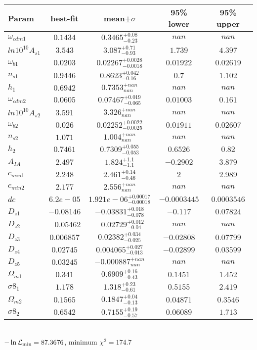 \begin{tabular}{|l|c|c|c|c|} 
 \hline 
Param & best-fit & mean$\pm\sigma$ & 95\% lower & 95\% upper \\ \hline 
$\omega_{cdm 1 }$ &$0.1434$ & $0.3465_{-0.23}^{+0.08}$ & $nan$ & $nan$ \\ 
$ln10^{10}A_{s 1 }$ &$3.543$ & $3.087_{-0.93}^{+0.71}$ & $1.739$ & $4.397$ \\ 
$\omega_{b 1 }$ &$0.0203$ & $0.02267_{-0.0018}^{+0.0028}$ & $0.01922$ & $0.02619$ \\ 
$n_{s 1 }$ &$0.9446$ & $0.8623_{-0.16}^{+0.042}$ & $0.7$ & $1.102$ \\ 
$h_{1 }$ &$0.6942$ & $0.7353_{nan}^{+nan}$ & $nan$ & $nan$ \\ 
$\omega_{cdm 2 }$ &$0.0605$ & $0.07467_{-0.065}^{+0.019}$ & $0.01003$ & $0.161$ \\ 
$ln10^{10}A_{s 2 }$ &$3.591$ & $3.326_{nan}^{+nan}$ & $nan$ & $nan$ \\ 
$\omega_{b 2 }$ &$0.026$ & $0.02252_{-0.0025}^{+0.0022}$ & $0.01911$ & $0.02607$ \\ 
$n_{s 2 }$ &$1.071$ & $1.004_{nan}^{+nan}$ & $nan$ & $nan$ \\ 
$h_{2 }$ &$0.7461$ & $0.7309_{-0.053}^{+0.055}$ & $0.6526$ & $0.82$ \\ 
$A_{IA }$ &$2.497$ & $1.824_{-1.1}^{+1.1}$ & $-0.2902$ & $3.879$ \\ 
$c_{min 1 }$ &$2.248$ & $2.461_{-0.46}^{+0.14}$ & $2$ & $2.989$ \\ 
$c_{min 2 }$ &$2.177$ & $2.556_{nan}^{+nan}$ & $nan$ & $nan$ \\ 
$dc$ &$6.2e-05$ & $1.921e-06_{-0.00018}^{+0.00017}$ & $-0.0003445$ & $0.0003546$ \\ 
$D_{z1 }$ &$-0.08146$ & $-0.03831_{-0.078}^{+0.018}$ & $-0.117$ & $0.07824$ \\ 
$D_{z2 }$ &$-0.05462$ & $-0.02729_{-0.04}^{+0.012}$ & $nan$ & $nan$ \\ 
$D_{z3 }$ &$0.006857$ & $0.02382_{-0.025}^{+0.034}$ & $-0.02808$ & $0.07799$ \\ 
$D_{z4 }$ &$0.02745$ & $0.004065_{-0.013}^{+0.027}$ & $-0.02899$ & $0.03599$ \\ 
$D_{z5 }$ &$0.03245$ & $-0.000887_{nan}^{+nan}$ & $nan$ & $nan$ \\ 
$\Omega_{m 1 }$ &$0.341$ & $0.6909_{-0.43}^{+0.16}$ & $0.1451$ & $1.452$ \\ 
$\sigma8_{1 }$ &$1.178$ & $1.318_{-0.61}^{+0.23}$ & $0.5155$ & $2.419$ \\ 
$\Omega_{m 2 }$ &$0.1565$ & $0.1847_{-0.13}^{+0.04}$ & $0.04871$ & $0.3546$ \\ 
$\sigma8_{2 }$ &$0.6542$ & $0.7155_{-0.57}^{+0.19}$ & $0.06089$ & $1.713$ \\ 
\hline 
 \end{tabular} \\ 
$-\ln{\cal L}_\mathrm{min} =87.3676$, minimum $\chi^2=174.7$ \\ 
